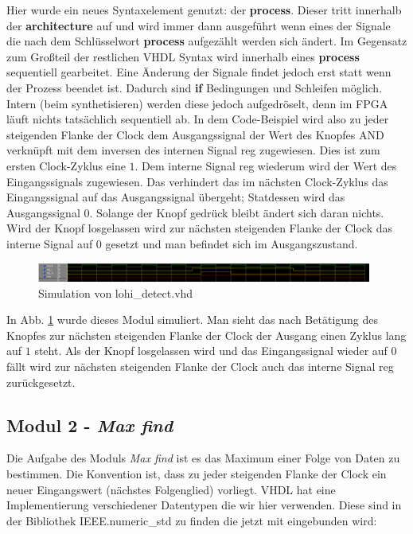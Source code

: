 

Hier wurde ein neues Syntaxelement genutzt: der \textbf{process}.
Dieser tritt innerhalb der \textbf{architecture} auf und wird immer dann ausgeführt wenn eines der Signale die nach dem Schlüsselwort \textbf{process} aufgezählt werden sich ändert.
Im Gegensatz zum Großteil der restlichen VHDL Syntax wird innerhalb eines \textbf{process} sequentiell gearbeitet.
Eine Änderung der Signale findet jedoch erst statt wenn der Prozess beendet ist.
Dadurch sind \textbf{if} Bedingungen und Schleifen möglich.
Intern (beim synthetisieren) werden diese jedoch aufgedröselt, denn im FPGA läuft nichts tatsächlich sequentiell ab.
In dem Code-Beispiel wird also zu jeder steigenden Flanke der Clock dem Ausgangssignal der Wert des Knopfes AND verknüpft mit dem inversen des internen Signal reg zugewiesen.
Dies ist zum ersten Clock-Zyklus eine $1$.
Dem interne Signal reg wiederum wird der Wert des Eingangssignals zugewiesen.
Das verhindert das im nächsten Clock-Zyklus das Eingangssignal auf das Ausgangssignal übergeht; Statdessen wird das Ausgangssignal $0$.
Solange der Knopf gedrück bleibt ändert sich daran nichts.
Wird der Knopf losgelassen wird zur nächsten steigenden Flanke der Clock das interne Signal auf $0$ gesetzt und man befindet sich im Ausgangszustand.

\begin{figure}[ht]
	\centering
    \includegraphics[width=0.98\textwidth]{../Daten/lohi_detect.png}
	\caption{Simulation von lohi\_detect.vhd}
	\label{img_lohi_detect}
\end{figure}

In Abb. \ref{img_lohi_detect} wurde dieses Modul simuliert.
Man sieht das nach Betätigung des Knopfes zur nächsten steigenden Flanke der Clock der Ausgang einen Zyklus lang auf $1$ steht.
Als der Knopf losgelassen wird und das Eingangssignal wieder auf $0$ fällt wird zur nächsten steigenden Flanke der Clock auch das interne Signal reg zurückgesetzt.

\subsection{Modul 2 - \textit{Max find}}

Die Aufgabe des Moduls \textit{Max find} ist es das Maximum einer Folge von Daten zu bestimmen.
Die Konvention ist, dass zu jeder steigenden Flanke der Clock ein neuer Eingangswert (nächstes Folgenglied) vorliegt.
VHDL hat eine Implementierung verschiedener Datentypen die wir hier verwenden.
Diese sind in der Bibliothek IEEE.numeric\_std zu finden die jetzt mit eingebunden wird:

